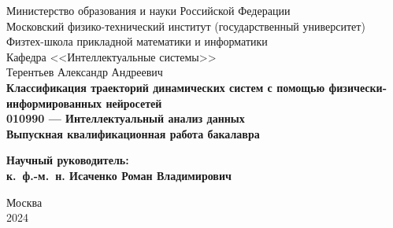 \documentclass[a4paper, 12pt]{article}
\begin{document}
	
	\thispagestyle{empty}
	\begin{center}
		\sc
		Министерство образования и науки Российской Федерации\\
		Московский физико-технический институт
		{\rm(государственный университет)}\\
		Физтех-школа прикладной математики и информатики\\
		Кафедра <<Интеллектуальные системы>>\\[35mm]
		\rm\large
		Терентьев Александр Андреевич\\[10mm]
		\bf\Large
		Классификация траекторий динамических систем с помощью физически-информированных нейросетей \\[10mm]
		\rm\normalsize
		010990 --- Интеллектуальный анализ данных\\[10mm]
		\sc
		Выпускная квалификационная работа бакалавра\\[10mm]
	\end{center}
	\hfill\parbox{80mm}{
		\begin{flushleft}
			\bf
			Научный руководитель:\\
			\rm
			к.~ф.-м.~н. 	
Исаченко Роман Владимирович\\[5cm]
		\end{flushleft}
	}
	\begin{center}
		Москва\\
		2024
	\end{center}
	
	\newpage
	\tableofcontents
	\newpage
	
\end{document}
